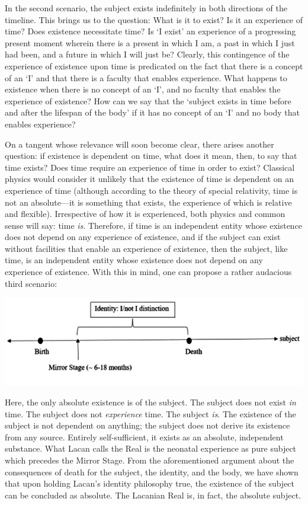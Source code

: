 In the second scenario, the subject exists indefinitely in both
directions of the timeline. This brings us to the question: What is it
to exist? Is it an experience of time? Does existence necessitate time?
Is `I exist' an experience of a progressing present moment wherein there
is a present in which I am, a past in which I just had been, and a
future in which I will just be? Clearly, this contingence of the
experience of existence upon time is predicated on the fact that there
is a concept of an `I' and that there is a faculty that enables
experience. What happens to existence when there is no concept of an
`I', and no faculty that enables the experience of existence? How can we
say that the `subject exists in time before and after the lifespan of
the body' if it has no concept of an `I' and no body that enables
experience?

On a tangent whose relevance will soon become clear, there arises
another question: if existence is dependent on time, what does it mean,
then, to say that time exists? Does time require an experience of time
in order to exist? Classical physics would consider it unlikely that the
existence of time is dependent on an experience of time (although
according to the theory of special relativity, time is not an absolute---it is something that
exists, the experience of which is relative and flexible). Irrespective
of how it is experienced, both physics and common sense will say: time
\emph{is}. Therefore, if time is an independent entity whose existence
does not depend on any experience of existence, and if the subject can
exist without facilities that enable an experience of existence, then
the subject, like time, is an independent entity whose existence does
not depend on any experience of existence. With this in mind, one can
propose a rather audacious third scenario:
\begin{center}
\includegraphics[scale = 0.45]{nathdiagram3}
\end{center}
Here,
the only absolute existence is of the subject. The subject does not
exist \emph{in} time. The subject does not \emph{experience} time. The
subject \emph{is}. The existence of the subject is not dependent on
anything; the subject does not derive its existence from any source.
Entirely self-sufficient, it exists as an absolute, independent
substance. What Lacan calls the Real is the neonatal experience as pure
subject which precedes the Mirror Stage. From the aforementioned
argument about the consequences of death for the subject, the identity,
and the body, we have shown that upon holding Lacan's identity
philosophy true, the existence of the subject can be concluded as
absolute. The Lacanian Real is, in fact, the absolute subject.

